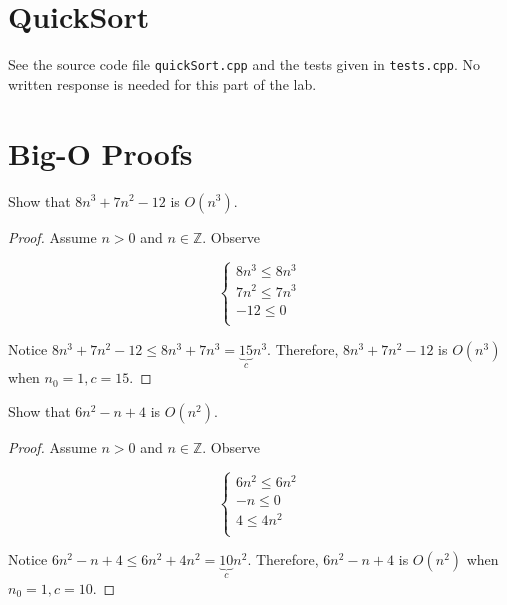 \documentclass{article}
\begin{document}
    \section{QuickSort}

    See the source code file \texttt{quickSort.cpp} and the tests
    given in \texttt{tests.cpp}. No written response is needed for
    this part of the lab.

    \section{Big-O Proofs}

    \vspace{2mm}
     Show that $8n^3+7n^2-12$ is $O(n^3)$.

\begin{proof}
    Assume $n>0$ and $n\in\mathbb{Z}$. Observe

    $$
    \begin{cases}
      8n^3\leq 8n^3\\
      7n^2\leq 7n^3\\
      -12\leq 0\\  
    \end{cases}
    $$

    Notice $8n^3+7n^2-12\leq 8n^3+7n^3=\underbrace{15}_{c}n^3$.
    Therefore, $8n^3+7n^2-12$ is $O(n^3)$ when $n_0=1, c=15$.

\end{proof}

    \vspace{1cm}
     Show that $6n^2-n+4$ is $O(n^2)$.

    \begin{proof}
        Assume $n>0$ and $n\in\mathbb{Z}$. Observe
    
        $$
        \begin{cases}
          6n^2\leq 6n^2\\
          -n\leq 0\\
          4\leq 4n^2\\  
        \end{cases}
        $$
    
        Notice $6n^2-n+4\leq 6n^2+4n^2=\underbrace{10}_{c}n^2$.
        Therefore, $6n^2-n+4$ is $O(n^2)$ when $n_0=1, c=10$.
    
    \end{proof}

    \newpage
    \vspace{1cm}
\end{document}
